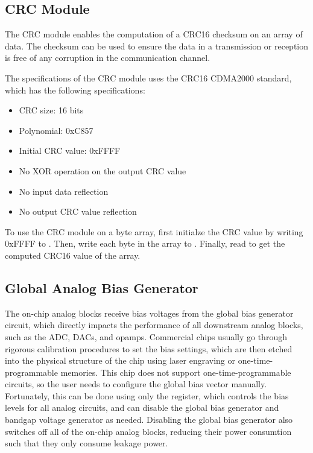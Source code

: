 \subsection{CRC Module}
The CRC module enables the computation of a CRC16 checksum on an array of data. The checksum can be used to ensure the data in a transmission or reception is free of any corruption in the communication channel.

The specifications of the CRC module uses the CRC16 CDMA2000 standard, which has the following specifications:
\begin{itemize}
\item CRC size: 16 bits
\item Polynomial: 0xC857
\item Initial CRC value: 0xFFFF
\item No XOR operation on the output CRC value
\item No input data reflection
\item No output CRC value reflection
\end{itemize}

To use the CRC module on a byte array, first initialze the CRC value by writing 0xFFFF to . Then, write each byte in the array to . Finally, read  to get the computed CRC16 value of the array.



\subsection{Global Analog Bias Generator}

The on-chip analog blocks receive bias voltages from the global bias generator circuit, which directly impacts the performance of all downstream analog blocks, such as the ADC, DACs, and opamps. Commercial chips usually go through rigorous calibration procedures to set the bias settings, which are then etched into the physical structure of the chip using laser engraving or one-time-programmable memories. This chip does not support one-time-programmable circuits, so the user needs to configure the global bias vector manually. Fortunately, this can be done using only the  register, which controls the bias levels for all analog circuits, and can disable the global bias generator and bandgap voltage generator as needed. Disabling the global bias generator also switches off all of the on-chip analog blocks, reducing their power consumtion such that they only consume leakage power.

